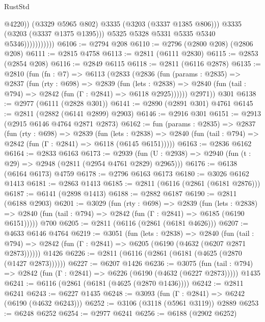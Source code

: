 \begin{lexlean}{RustStd}
\begin{coremodule}
{\begin{coremodule}
{{{{{{{{{{{{{{{                                  @4220))
                              (@3329 @5965 @802)
                              @3335
                              (@3203 (@3337 @1385 @806)))
                            @3335
                            (@3203 (@3337 @1375 @1395)))
                          @5325
                          @5328
                          @5331
                          @5335
                          @5340
                          @5346)))))))))))
@6106 := @2794 @208
@6110 := @2796 (@2800 @208) (@2806 @208)
@6111 := @2815 @4758
@6113 := @2811 (@6111 @2830)
@6115 := @2853 (@2854 @208)
@6116 := @2849 @6115
@6118 := @2811 (@6116 @2878)
@6135 := @2810
    (fun (fn : @7) =>
    @6113
      (@2833
        (@2836
          (fun (params : @2835) =>
          @2837
            (fun (rty : @698) =>
            @2839
              (fun (lets : @2838) =>
              @2840 (fun (tail : @794) => @2842 (fun (Γ : @2841) => @6118 @2925))))))
        @2971))
    @301
@6138 := @2977 (@6111 (@2828 @301))
@6141 := @2890 (@2891 @301) @4761
@6145 := @2811 (@2882 (@6141 @2899) @2903)
@6146 := @2916 @301
@6151 := @2913 (@2915 @6146 @4764 @2871 @2873)
@6162 := fun (params : @2835) =>
  @2837
    (fun (rty : @698) =>
    @2839
      (fun (lets : @2838) =>
      @2840 (fun (tail : @794) => @2842 (fun (Γ : @2841) => @6118 (@6145 @6151)))))
@6163 := @2836 @6162
@6164 := @2833 @6163
@6173 := @2939 (fun (U : @2938) => @2940 (fun (t : @29) => @2948 (@2811 (@2954 @4761 @2829) @2965)))
@6176 := @6138 (@6164 @6173) @4759
@6178 := @2796 @6163 @6173
@6180 := @3026 @6162 @1413
@6181 := @2863 @1413
@6185 := @2811 (@6116 (@2861 (@6181 @2876)))
@6187 := @6141 (@2898 @1413)
@6188 := @2882 @6187
@6190 := @2811 (@6188 @2903)
@6201 := @3029
    (fun (rty : @698) =>
    @2839
      (fun (lets : @2838) =>
      @2840 (fun (tail : @794) => @2842 (fun (Γ : @2841) => @6185 (@6190 @6151)))))
    @700
@6205 := @2811 (@6116 (@2861 (@6181 @4626)))
@6207 := @4633 @6146 @4764
@6219 := @3051
    (fun (lets : @2838) =>
    @2840
      (fun (tail : @794) => @2842 (fun (Γ : @2841) => @6205 (@6190 (@4632 (@6207 @2871 @2873))))))
    @1426
@6226 := @2811 (@6116 (@2861 (@6181 (@4625 (@2870 (@1427 @2873))))))
@6227 := @6207 @1426
@6236 := @3075
    (fun (tail : @794) => @2842 (fun (Γ : @2841) => @6226 (@6190 (@4632 (@6227 @2873)))))
    @1435
@6241 := @6116 (@2861 (@6181 (@4625 (@2870 @1436))))
@6242 := @2811 @6241
@6243 := @6227 @1435
@6248 := @3093 (fun (Γ : @2841) => @6242 (@6190 (@4632 @6243)))
@6252 := @3106 (@3118 (@5961 @3119)) @2889
@6253 := @6248 @6252
@6254 := @2977 @6241
@6256 := @6188 (@2902 @6252)
}}}}}}}}}}}}}}}
\end{coremodule}}
\end{coremodule}
\end{lexlean}
